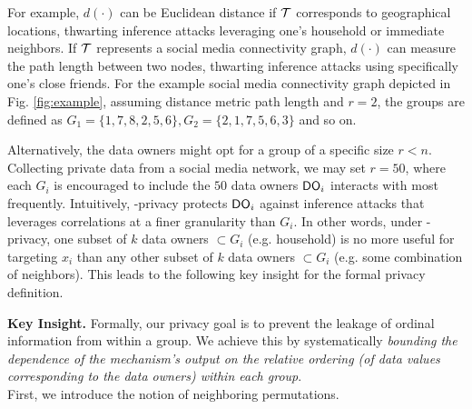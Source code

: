 For example, $d(\cdot)$ can be Euclidean distance if $\mathcal{T}$ corresponds to geographical locations, thwarting inference attacks leveraging one's household or immediate neighbors.
If $\mathcal{T}$ represents a social media connectivity graph, $d(\cdot)$ can measure the path length between two nodes, thwarting inference attacks using specifically one's close friends. For the example social media connectivity graph depicted in Fig. \ref{fig:example}, assuming distance metric path length and $r=2$, the groups are defined as  $G_1=\{1,7,8,2,5,6\}, G_2=\{2,1,7,5,6,3\}$ and so on. 

\item  Alternatively, the data owners might opt for a group of a specific size $r < n$. Collecting private data from a social media network, we may set $r = 50$, where each $G_i$ is encouraged to include the $50$ data owners $\textsf{DO}_i$ interacts with most frequently. 
\squishendfour 
   \vspace{-0.3cm}
Intuitively, \name-privacy protects $\textsf{DO}_i$ against inference attacks that leverages correlations at a finer granularity than $G_i$. In other words, under \name-privacy, one subset of $k$ data owners $\subset G_i$ (e.g. household) is no more useful for targeting $x_i$ than any other subset of $k$ data owners $\subset G_i$ (e.g. some combination of neighbors). 
This leads to the following key insight for the formal privacy definition. 

\textbf{Key Insight.} Formally, our privacy goal is to prevent the leakage of ordinal information from within a group. We achieve this by  systematically \textit{bounding the dependence of the mechanism's output on the relative ordering (of data values corresponding to the data owners) within each group}. \\First, we introduce the notion of neighboring permutations. 

